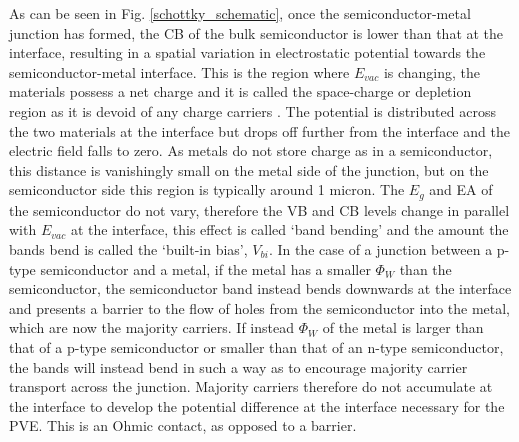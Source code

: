 \documentclass[11pt, twoside]{report}
\begin{document}
As can be seen in Fig. \ref{schottky_schematic}, once the semiconductor-metal junction has formed, the CB of the bulk semiconductor is lower than that at the interface, resulting in a spatial variation in electrostatic potential towards the semiconductor-metal interface. This is the region where $E_{vac}$ is changing, the materials possess a net charge and it is called the space-charge or depletion region as it is devoid of any charge carriers \cite{PV_bands_book}. The potential is distributed across the two materials at the interface but drops off further from the interface and the electric field falls to zero.  As metals do not store charge as in a semiconductor, this distance is vanishingly small on the metal side of the junction, but on the semiconductor side this region is typically around 1 micron. The $E_g$ and EA of the semiconductor do not vary, therefore the VB and CB levels change in parallel with $E_{vac}$ at the interface, this effect is called `band bending' and the amount the bands bend is called the `built-in bias', $V_{bi}$.
In the case of a junction between a p-type semiconductor and a metal, if the metal has a smaller $\Phi_W$ than the semiconductor, the semiconductor band instead bends downwards at the interface and presents a barrier to the flow of holes from the semiconductor into the metal, which are now the majority carriers.
If instead $\Phi_W$ of the metal is larger than that of a p-type semiconductor or smaller than that of an n-type semiconductor, the bands will instead bend in such a way as to encourage majority carrier transport across the junction. Majority carriers therefore do not accumulate at the interface to develop the potential difference at the interface necessary for the PVE. This is an Ohmic contact, as opposed to a barrier. 
\end{document}
